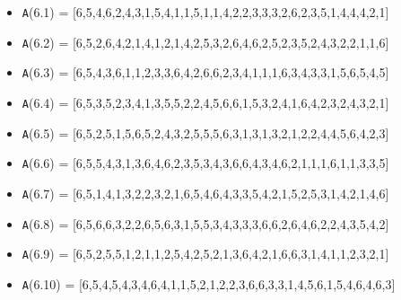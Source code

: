 \documentclass[runningheads,a4paper]{llncs}
\begin{document}
\begin{itemize}
	\item {\texttt A(6.1) = } [6,5,4,6,2,4,3,1,5,4,1,1,5,1,1,4,2,2,3,3,3,2,6,2,3,5,1,4,4,4,2,1]
	\item {\texttt A(6.2) = } [6,5,2,6,4,2,1,4,1,2,1,4,2,5,3,2,6,4,6,2,5,2,3,5,2,4,3,2,2,1,1,6]
	\item {\texttt A(6.3) = } [6,5,4,3,6,1,1,2,3,3,6,4,2,6,6,2,3,4,1,1,1,6,3,4,3,3,1,5,6,5,4,5]
	\item {\texttt A(6.4) = } [6,5,3,5,2,3,4,1,3,5,5,2,2,4,5,6,6,1,5,3,2,4,1,6,4,2,3,2,4,3,2,1]
	\item {\texttt A(6.5) = } [6,5,2,5,1,5,6,5,2,4,3,2,5,5,5,6,3,1,3,1,3,2,1,2,2,4,4,5,6,4,2,3]
	
	\item {\texttt A(6.6) = } [6,5,5,4,3,1,3,6,4,6,2,3,5,3,4,3,6,6,4,3,4,6,2,1,1,1,6,1,1,3,3,5]
	\item {\texttt A(6.7) = } [6,5,1,4,1,3,2,2,3,2,1,6,5,4,6,4,3,3,5,4,2,1,5,2,5,3,1,4,2,1,4,6]
	\item {\texttt A(6.8) = } [6,5,6,6,3,2,2,6,5,6,3,1,5,5,3,4,3,3,3,6,6,2,6,4,6,2,2,4,3,5,4,2]
	\item {\texttt A(6.9) = } [6,5,2,5,5,1,2,1,1,2,5,4,2,5,2,1,3,6,4,2,1,6,6,3,1,4,1,1,2,3,2,1]
	\item {\texttt A(6.10) = } [6,5,4,5,4,3,4,6,4,1,1,5,2,1,2,2,3,6,6,3,3,1,4,5,6,1,5,4,6,4,6,3]	

\end{itemize}
\end{document}
